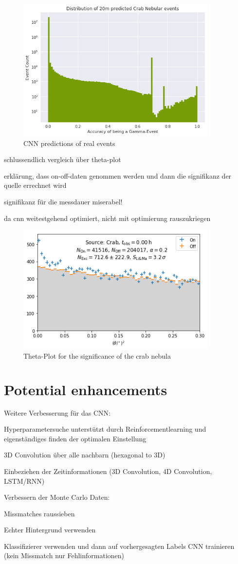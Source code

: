 \begin{figure}
    \centering
    \includegraphics[width=10cm]{Plots/Predicting_real_data.png}
    \caption{CNN predictions of real events}
    \label{fig:histogram_real_data}
\end{figure}

schlussendlich vergleich über theta-plot

erklärung, dass on-off-daten genommen werden und dann die signifikanz der quelle errechnet wird

signifikanz für die messdauer miserabel!

da cnn weitestgehend optimiert, nicht mit optimierung rauszukriegen

\begin{figure}
    \centering
    \includegraphics[width=10cm]{Plots/Theta_Plot.png}
    \caption{Theta-Plot for the significance of the crab nebula}
    \label{fig:theta_plot}
\end{figure}


\section{Potential enhancements}

Weitere Verbesserung für das CNN:

Hyperparametersuche unterstützt durch Reinforcementlearning und eigenständiges finden der optimalen Einstellung

3D Convolution über alle nachbarn (hexagonal to 3D)

Einbeziehen der Zeitinformationen (3D Convolution, 4D Convolution, LSTM/RNN)

Verbessern der Monte Carlo Daten:

Missmatches raussieben

Echter Hintergrund verwenden

Klassifizierer verwenden und dann auf vorhergesagten Labels CNN trainieren (kein Missmatch nur Fehlinformationen)
